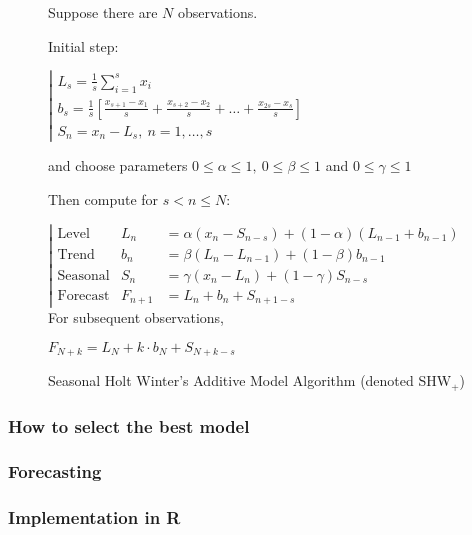 \begin{figure}[H]
\begin{tcolorbox}[width=.6\textwidth]%

Suppose there are $N$ observations.

Initial step:

$\left|\begin{array}{l}
L_s = \frac1s \sum_{i=1}^s x_i \\
b_s = \frac1s \left[\frac{x_{s+1}-x_1}{s}+\frac{x_{s+2}-x_2}{s}+\dots+\frac{x_{2s}-x_s}{s}\right]\\
S_n  = x_n-L_s, \ n=1,\dots,s
\end{array}\right.$

and choose parameters $0\leq\alpha\leq1,\ 0\leq\beta\leq1$ and $0\leq\gamma\leq1$

Then compute for $s<n\leq N$:

$\left|\begin{array}{lll}
\text{Level} &       L_n & = \alpha (x_n-S_{n-s})+(1-\alpha)(L_{n-1}+b_{n-1})\\
\text{Trend} &      b_n & = \beta(L_n-L_{n-1})+(1-\beta)b_{n-1}\\
\text{Seasonal} & S_n & = \gamma (x_n-L_n) + (1-\gamma)S_{n-s}\\
\text{Forecast} & F_{n+1} & = L_n+b_n+S_{n+1-s}
\end{array}\right.$
For subsequent observations,

$F_{N+k}=L_N+k\cdot b_N+S_{N+k-s}$
\label{SHWx}
\end{tcolorbox}
\caption{Seasonal Holt Winter’s Additive Model Algorithm (denoted SHW$_{+}$)}
\end{figure}


\subsubsection{How to select the best model}

\subsubsection{Forecasting}

\subsubsection{Implementation in R}

